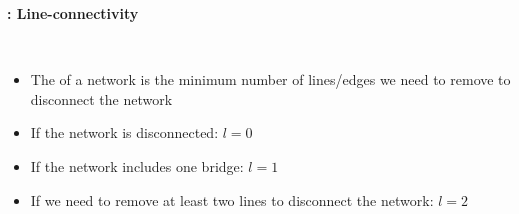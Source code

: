 \documentclass[8pt]{beamer}
\begin{document}
\begin{frame}
\frametitle{\insertsection}
\framesubtitle{\insertsubsection: Line-connectivity}

\begin{columns}[c]

\begin{minipage}[c][.5\textheight][c]{\linewidth}

\begin{itemize}[<+->]
	\item The {\color{blue}{line-connectivity}} of a network is the minimum number of lines/edges we need to remove to disconnect the network
	\item If the network is disconnected: $l=0$
	\item If the network includes one bridge: $l=1$
	\item If we need to remove at least two lines to disconnect the network: $l=2$
\end{itemize}

\end{minipage}	   

\begin{minipage}[c][.5\textheight][c]{\linewidth}
\centering
{}
\end{minipage}	 

\end{columns}

\end{frame}
\end{document}
